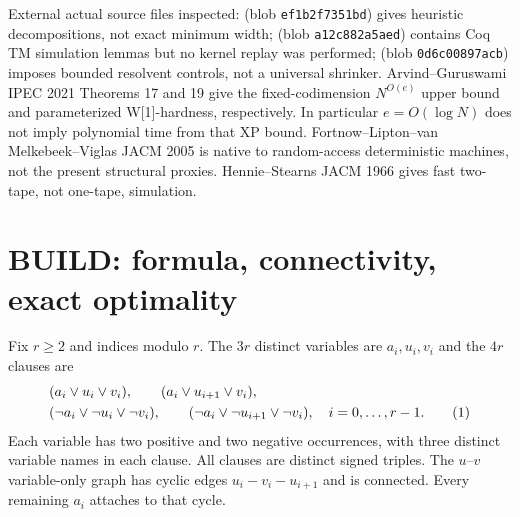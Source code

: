 \documentclass[11pt]{article}
\begin{document}
External actual source files inspected:  (blob \texttt{ef1b2f7351bd}) gives heuristic decompositions, not exact minimum width;  (blob \texttt{a12c882a5aed}) contains Coq TM simulation lemmas but no kernel replay was performed;  (blob \texttt{0d6c00897acb}) imposes bounded resolvent controls, not a universal shrinker. Arvind--Guruswami IPEC 2021 Theorems 17 and 19 give the fixed-codimension $N^{O(e)}$ upper bound and parameterized W[1]-hardness, respectively. In particular $e=O(\log N)$ does not imply polynomial time from that XP bound. Fortnow--Lipton--van Melkebeek--Viglas JACM 2005 is native to random-access deterministic machines, not the present structural proxies. Hennie--Stearns JACM 1966 gives fast two-tape, not one-tape, simulation.

\section{BUILD: formula, connectivity, exact optimality}
Fix $r\ge2$ and indices modulo $r$. The $3r$ distinct variables are $a_i,u_i,v_i$ and the $4r$ clauses are
\begin{align}
 &(a_i\vee u_i\vee v_i),\qquad (a_i\vee u_{i+1}\vee v_i),\notag\\
 &(\neg a_i\vee\neg u_i\vee\neg v_i),\qquad
 (\neg a_i\vee\neg u_{i+1}\vee\neg v_i),\quad i=0,\ldots,r-1. \tag{1}
\end{align}
Each variable has two positive and two negative occurrences, with three distinct variable names in each clause. All clauses are distinct signed triples. The $u$--$v$ variable-only graph has cyclic edges $u_i-v_i-u_{i+1}$ and is connected. Every remaining $a_i$ attaches to that cycle.
\end{document}
